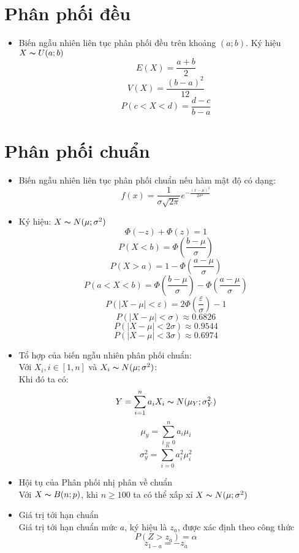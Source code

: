 \documentclass[utf8,a4paper]{article}
\begin{document}
\section[]{Phân phối đều}
\begin{itemize}
  \item Biến ngẫu nhiên liên tục phân phối đều trên khoảng \((a;b)\). Ký hiệu \(X \thicksim U(a;b)\)
    \[E(X) = \frac{a + b}{2}\]
    \[V(X) = \frac{{(b - a)^{2}}}{12}\]
    \[P(c < X < d) = \frac{d - c}{b - a}\]
\end{itemize}

\section[]{Phân phối chuẩn}
\begin{itemize}
  \item Biến ngẫu nhiên liên tục phân phối chuẩn nếu hàm mật độ có dạng:
    \[f(x) = \frac{1}{\sigma \sqrt{2 \pi}} {e}^{-\frac{{(x - \mu)}^{2}}{2 {\sigma}^{2}}}\]
  \item Ký hiệu: \(X \thicksim N(\mu ; {\sigma}^{2})\)
    \[\Phi \left(-z\right) + \Phi \left(z\right) = 1\]
    \[P(X < b) = \Phi \left(\frac{b - \mu}{\sigma}\right)\]
    \[P(X > a) = 1 - \Phi \left(\frac{a - \mu}{\sigma}\right)\]
    \[P(a < X < b) = \Phi \left( \frac{b - \mu}{\sigma} \right) - \Phi \left( \frac{a - \mu}{\sigma} \right)\]
    \[P(|X - \mu| < \varepsilon) = 2 \Phi \left( \frac{\varepsilon}{\sigma}\right) - 1\]
    \[P(|X - \mu| < \sigma) \approx 0.6826\]
    \[P(|X - \mu| < 2\sigma) \approx 0.9544\]
    \[P(|X - \mu| < 3\sigma) \approx 0.6974\]
  \item Tổ hợp của biến ngẫu nhiên phân phối chuẩn: \\
    Với \({X}_{i}, i \in \left[1, n\right]\) và \({X}_{i} \thicksim N(\mu; {\sigma}^{2})\): \\
    Khi đó ta có:
    \[Y = \sum^{n}_{i = 1}{{a}_{i}{X}_{i}} \thicksim N({\mu}_{Y}; {\sigma}^{2}_{Y})\]
    \[{\mu}_{y} = \sum^{n}_{i = 0}{{a}_{i}{\mu}_{i}}\]
    \[{\sigma}^{2}_{y} = \sum^{n}_{i = 0}{{a}^{2}_{i}{\mu}^{2}_{i}}\]
  \item Hội tụ của Phân phối nhị phân về chuẩn \\
    Với \(X \thicksim B(n; p)\), khi \(n \geq 100\) ta có thể xấp xỉ \(X \thicksim N(\mu; {\sigma}^{2})\)
  \item Giá trị tới hạn chuẩn \\
    Giá trị tới hạn chuẩn mức \(a\), ký hiệu là \({z}_{a}\), được xác định theo công thức
    \[P(Z > {z}_{a}) = \alpha\]
    \[{z}_{1 - a} = -{z}_{a}\]
\end{itemize}
\end{document}
